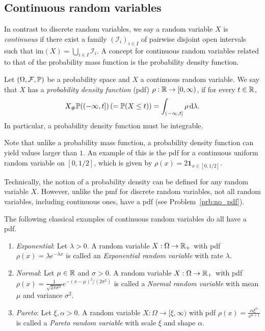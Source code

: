 \subsection{Continuous random variables}\label{ssec:contrinuous_rv}

In contrast to discrete random variables, we say a random variable $X$ is \emph{continuous} if there exist a family  $(\mathcal{I}_i)_{i \in I}$ of pairwise disjoint open intervals such that $\mathrm{im}(X) = \bigcup_{i \in I} \mathcal{I}_i$.
A concept for continuous random variables related to that of the probability mass function is the probability density function. 

\begin{definition}\label{def:pdf}
Let $(\Omega, \mathcal F, \mathbb{P})$ be a probability space and $X$ a continuous random variable. We say that $X$ has a \emph{probability density function} (pdf) $\rho : \mathbb R \to [0,\infty)$, if for every $t \in \mathbb R$,
\[
	X_\# \mathbb P((-\infty , t]) \, (= \mathbb P(X \le t)) = \int_{(-\infty,t]} \rho \, \mathrm{d} \lambda.
\]
In particular, a probability density function must be integrable.
\end{definition}

Note that unlike a probability mass function, a probability density function can yield values larger than $1$. An example of this is the pdf for a continuous uniform random variable on $[0,1/2]$, which is given by $\rho(x) = 2 \mathbf{1}_{x \in [0,1/2]}$.

Technically, the notion of a probability density can be defined for any random variable $X$. However, unlike the pmf for discrete random variables, not all random variables, including continuous ones, have a pdf (see Problem~\ref{prb:no_pdf}).

The following classical examples of continuous random variables do all have a pdf.

\begin{example}\hfill
\begin{enumerate}[label=(\alph*)]
\item \textit{Exponential}: Let $\lambda > 0$. A random variable $X : \Omega \to \mathbb R_+$ with pdf $\rho(x) = \lambda e^{-\lambda x}$ is called an \emph{Exponential random variable} with rate $\lambda$.
\item \textit{Normal}: Let $\mu \in \mathbb R$ and $\sigma > 0$. A random variable $X : \Omega \to \mathbb R_+$ with pdf $\rho(x) = \frac{1}{\sqrt{2 \pi \sigma^2}} e^{-(x - \mu)^2/(2\sigma^2)}$ is called a \emph{Normal random variable} with mean $\mu$ and variance $\sigma^2$.
\item \textit{Pareto}: Let $\xi, \alpha > 0$. A random variable $X : \Omega \to [\xi, \infty)$ with pdf $\rho(x) = \frac{\alpha \xi^\alpha}{x^{\alpha +1}}$ is called a \emph{Pareto random variable} with scale $\xi$ and shape $\alpha$.
\end{enumerate} 
\end{example}



